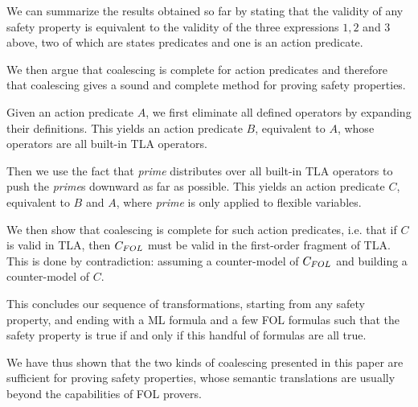 \documentclass{easychair}
\newcommand{\FOL}[1]{\ensuremath{#1_{\textit{\scriptsize FOL}}}}
\newtheorem{corollary}[theorem]{Corollary}
\begin{document}
%

We can summarize the results obtained so far by stating that
the validity of any safety property is equivalent to the validity
of the three expressions $1,2$ and $3$ above, two of which
are states predicates and one is an action predicate.

We then argue that coalescing is
complete for action predicates and therefore that coalescing gives a
sound and complete method for proving safety properties.

Given an action predicate $A$, we first eliminate all defined
operators by expanding their definitions. This yields an action
predicate $B$, equivalent to $A$, whose operators are all built-in
TLA operators.

Then we use the fact that \emph{prime} distributes over all built-in
TLA operators to push the \emph{prime}s downward as far as
possible. This yields an action predicate $C$, equivalent to $B$
and $A$, where \emph{prime} is only applied to flexible variables.

We then show that coalescing is complete for such action predicates,
i.e. that if $C$ is valid in TLA, then $\FOL{C}$ must be valid in the
first-order fragment of TLA. This is done by contradiction: assuming a
counter-model of $\FOL{C}$ and building a counter-model of $C$.

This concludes our sequence of transformations, starting from any
safety property, and ending with a ML formula and a few FOL formulas such
that the safety property is true if and only if this handful of
formulas are all true.

We have thus shown that the two kinds of
coalescing presented in this paper are sufficient for proving safety
properties, whose semantic translations are usually beyond the
capabilities of FOL provers.
\end{document}
